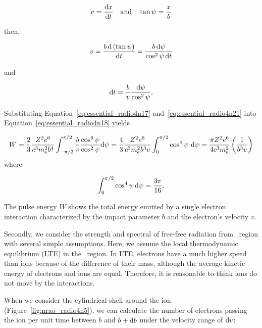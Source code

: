 \begin{equation}\label{eq:essential_radio4n19}
    v = \frac{\mathrm{d} x}{\mathrm{d} t}\ \ \ \mathrm{and}\ \ \ \tan\psi = \frac{x}{b}
\end{equation}

then,

\begin{equation}\label{eq:essential_radio4n20}
    v=\frac{b\,\mathrm{d}\left(\tan \psi\right)}{\mathrm{d} t} = \frac{b\,\mathrm{d} \psi}{\cos ^{2}\psi\,\mathrm{d} t}
\end{equation}

and

\begin{equation}\label{eq:essential_radio4n21}
    \mathrm{d} t=\frac{b}{v} \frac{\mathrm{d} \psi}{\cos ^{2} \psi}.
\end{equation}

Substituting Equation~\ref{eq:essential_radio4n17} and~\ref{eq:essential_radio4n21} into Equation~\ref{eq:essential_radio4n18} yields

\begin{equation}\label{eq:essential_radio4n22}
    W=\frac{2}{3} \frac{Z^{2} e^{6}}{c^{3} m_{\mathrm{e}}^{2} b^{4}} \int_{-\pi / 2}^{\pi / 2} \frac{b}{v} \frac{\cos ^{6} \psi}{\cos ^{2} \psi} \mathrm{d} \psi=\frac{4}{3} \frac{Z^{2} e^{6}}{c^{3} m_{\mathrm{e}}^{2} b^{3} v} \int_{0}^{\pi / 2} \cos ^{4} \psi\ \mathrm{d} \psi = \frac{\pi Z^2 e^6}{4 c^3 m_{\mathrm{e}}^2}\left(\frac{1}{b^3v}\right)
\end{equation}
where

\begin{equation}\label{eq:integral_costo4}
    \int_{0}^{\pi / 2} \cos ^{4} \psi\,\mathrm{d} \psi=\frac{3 \pi}{16}.
\end{equation}

The pulse energy $W$ shows the total energy emitted by a single electron interaction characterized by the impact parameter $b$ and the electron's velocity $v$.\\ \vspace{0.2cm}

Secondly, we consider the strength and spectral of free-free radiation from \ih~region with several simple assumptions.
Here, we assume the local thermodynamic equilibrium (LTE) in the \ih~region.
In LTE, electrons have a much higher speed than ions because of the difference of their mass, although the average kinetic energy of electrons and ions are equal.
Therefore, it is reasonable to think ions do not move by the interactions.

When we consider the cylindrical shell around the ion (Figure~\ref{fig:nrao_radio4n5}), we can calculate the number of electrons passing the ion per unit time between $b$ and $b + \mathrm{d} b$ under the velocity range of $\mathrm{d} v$:


